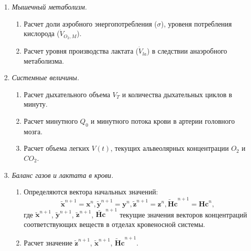 \begin{enumerate}
	
	\item {\it Мышечный метаболизм.}

\begin{enumerate}
	
	\item \label{it:iter_start} Расчет доли аэробного энергопотребления ($\sigma$), уровеня потребления кислорода ($\dot{V}_{O_{2},M}$). 
	
	\item Расчет уровня производства лактата ($\dot{V}_{la}$) в следствии анаэробного метаболизма.
	
\end{enumerate}	

	\item {\it Системные величины.}

\begin{enumerate}
		
	\item Расчет дыхательного объема $V_{T}$ и количества дыхательных циклов в минуту. 
	
	\item Расчет минутного  $Q_{0}$ и минутного потока крови в артерии головного мозга. 
	
	\item Расчет объема легких $V(t)$, текущих альвеолярных концентрации $O_{2}$ и $CO_{2}$.   

\end{enumerate}

	\item {\it Баланс газов и лактата в крови.}

\begin{enumerate}	
	
	\item Определяются вектора начальных значений:
	\begin{equation*}
	\tilde{\mathbf{x}}^{n+1} = \mathbf{x}^{n}, \tilde{\mathbf{y}}^{n+1} = \mathbf{y}^{n}, \tilde{\mathbf{z}}^{n+1} = \mathbf{z}^{n}, \mathbf{\tilde{H}c}^{n+1} = \mathbf{Hc}^{n}, 
	\end{equation*}
	где $\tilde{\mathbf{x}}^{n+1}$, $\tilde{\mathbf{y}}^{n+1}$, $\tilde{\mathbf{z}}^{n+1}$, $\tilde{\mathbf{Hc}}^{n+1}$ текущие значения векторов концентраций соответствующих веществ в отделах кровеносной системы.
	
	\item Расчет значение $\tilde{\mathbf{z}}^{n+1}$, $\tilde{\mathbf{x}}^{n+1}$, $\mathbf{\widetilde{H}c}^{n+1}$.
	

\end{enumerate}
\end{enumerate}
